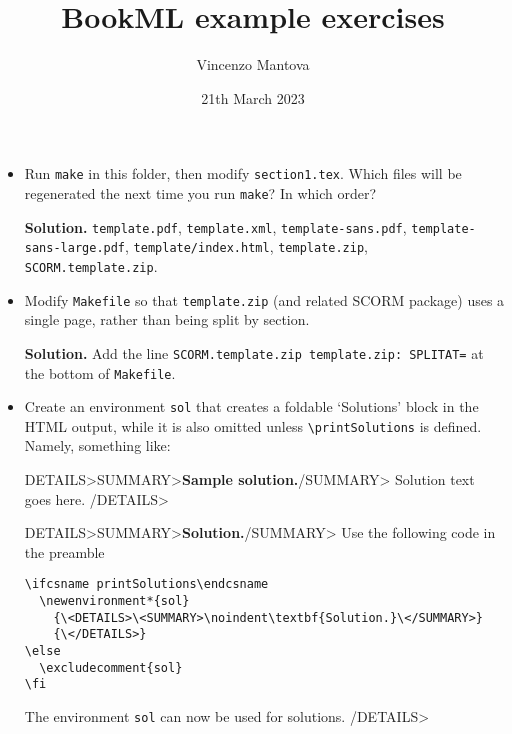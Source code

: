 \documentclass[oneside,11pt]{amsart}
\title{BookML example exercises}
\author{Vincenzo Mantova}
\date{21th March 2023}
\newenvironment*{sol}
    {\<DETAILS>\<SUMMARY>\noindent\textbf{Solution.}\</SUMMARY>}
    {\</DETAILS>}
\begin{document}
\maketitle

\begin{itemize}
  \item Run \texttt{make} in this folder, then modify \texttt{section1.tex}. Which files will be regenerated the next time you run \texttt{make}? In which order?

\begin{solution}
  \noindent\textbf{Solution.} \texttt{template.pdf}, \texttt{template.xml}, \texttt{template-sans.pdf}, \texttt{template-sans-large.pdf}, \texttt{template/index.html}, \texttt{template.zip}, \texttt{SCORM.template.zip}.
\end{solution}
  \item Modify \texttt{Makefile} so that \texttt{template.zip} (and related SCORM package) uses a single page, rather than being split by section.

\begin{solution}
  \noindent\textbf{Solution.} Add the line \texttt{SCORM.template.zip template.zip: SPLITAT=} at the bottom of \texttt{Makefile}.
\end{solution}

  \item Create an environment \texttt{sol} that creates a foldable `Solutions' block in the HTML output, while it is also omitted unless \texttt{\textbackslash{}printSolutions} is defined. Namely, something like:

\<DETAILS>\<SUMMARY>\noindent\textbf{Sample solution.}\</SUMMARY>
  Solution text goes here.
\</DETAILS>

\begin{sol}
  Use the following code in the preamble
  \begin{lstlisting}
\ifcsname printSolutions\endcsname
  \newenvironment*{sol}
    {\<DETAILS>\<SUMMARY>\noindent\textbf{Solution.}\</SUMMARY>}
    {\</DETAILS>}
\else
  \excludecomment{sol}
\fi
  \end{lstlisting}
  The environment \texttt{sol} can now be used for solutions.
\end{sol}
\end{itemize}
\end{document}
